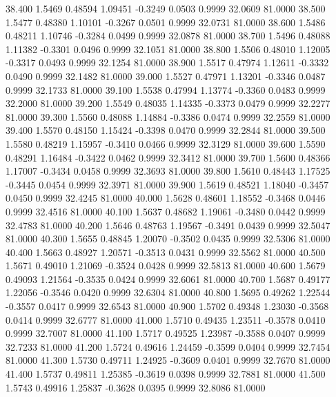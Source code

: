   38.400   1.5469   0.48594   1.09451  -0.3249   0.0503   0.9999  32.0609  81.0000
  38.500   1.5477   0.48380   1.10101  -0.3267   0.0501   0.9999  32.0731  81.0000
  38.600   1.5486   0.48211   1.10746  -0.3284   0.0499   0.9999  32.0878  81.0000
  38.700   1.5496   0.48088   1.11382  -0.3301   0.0496   0.9999  32.1051  81.0000
  38.800   1.5506   0.48010   1.12005  -0.3317   0.0493   0.9999  32.1254  81.0000
  38.900   1.5517   0.47974   1.12611  -0.3332   0.0490   0.9999  32.1482  81.0000
  39.000   1.5527   0.47971   1.13201  -0.3346   0.0487   0.9999  32.1733  81.0000
  39.100   1.5538   0.47994   1.13774  -0.3360   0.0483   0.9999  32.2000  81.0000
  39.200   1.5549   0.48035   1.14335  -0.3373   0.0479   0.9999  32.2277  81.0000
  39.300   1.5560   0.48088   1.14884  -0.3386   0.0474   0.9999  32.2559  81.0000
  39.400   1.5570   0.48150   1.15424  -0.3398   0.0470   0.9999  32.2844  81.0000
  39.500   1.5580   0.48219   1.15957  -0.3410   0.0466   0.9999  32.3129  81.0000
  39.600   1.5590   0.48291   1.16484  -0.3422   0.0462   0.9999  32.3412  81.0000
  39.700   1.5600   0.48366   1.17007  -0.3434   0.0458   0.9999  32.3693  81.0000
  39.800   1.5610   0.48443   1.17525  -0.3445   0.0454   0.9999  32.3971  81.0000
  39.900   1.5619   0.48521   1.18040  -0.3457   0.0450   0.9999  32.4245  81.0000
  40.000   1.5628   0.48601   1.18552  -0.3468   0.0446   0.9999  32.4516  81.0000
  40.100   1.5637   0.48682   1.19061  -0.3480   0.0442   0.9999  32.4783  81.0000
  40.200   1.5646   0.48763   1.19567  -0.3491   0.0439   0.9999  32.5047  81.0000
  40.300   1.5655   0.48845   1.20070  -0.3502   0.0435   0.9999  32.5306  81.0000
  40.400   1.5663   0.48927   1.20571  -0.3513   0.0431   0.9999  32.5562  81.0000
  40.500   1.5671   0.49010   1.21069  -0.3524   0.0428   0.9999  32.5813  81.0000
  40.600   1.5679   0.49093   1.21564  -0.3535   0.0424   0.9999  32.6061  81.0000
  40.700   1.5687   0.49177   1.22056  -0.3546   0.0420   0.9999  32.6304  81.0000
  40.800   1.5695   0.49262   1.22544  -0.3557   0.0417   0.9999  32.6543  81.0000
  40.900   1.5702   0.49348   1.23030  -0.3568   0.0414   0.9999  32.6777  81.0000
  41.000   1.5710   0.49435   1.23511  -0.3578   0.0410   0.9999  32.7007  81.0000
  41.100   1.5717   0.49525   1.23987  -0.3588   0.0407   0.9999  32.7233  81.0000
  41.200   1.5724   0.49616   1.24459  -0.3599   0.0404   0.9999  32.7454  81.0000
  41.300   1.5730   0.49711   1.24925  -0.3609   0.0401   0.9999  32.7670  81.0000
  41.400   1.5737   0.49811   1.25385  -0.3619   0.0398   0.9999  32.7881  81.0000
  41.500   1.5743   0.49916   1.25837  -0.3628   0.0395   0.9999  32.8086  81.0000
